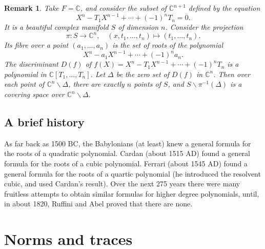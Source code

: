 \documentclass[a4paper,11pt,final,openany]{memoir}
\newtheorem{remark}[X]{Remark}
\theoremstyle{nonumberplain}
\begin{document}
\begin{remark}
\label{ag31}Take $F=\mathbb{C}$, and consider the subset of $\mathbb{C}^{n+1}
$ defined by the equation%
\[
X^{n}-T_{1}X^{n-1}+\cdots+(-1)^{n}T_{n}=0.
\]
It is a beautiful complex manifold $S$ of dimension $n$. Consider the
projection
\[
\pi\colon S\rightarrow\mathbb{C}^{n},\quad(x,t_{1},\ldots,t_{n})\mapsto
(t_{1},\ldots,t_{n}).
\]
Its fibre over a point $(a_{1},\ldots,a_{n})$ is the set of roots of the
polynomial
\[
X^{n}-a_{1}X^{n-1}+\cdots+(-1)^{n}a_{n}.
\]
The discriminant $D(f)$ of $f(X)=X^{n}-T_{1}X^{n-1}+\cdots+(-1)^{n}T_{n}$ is a
polynomial in $\mathbb{C}[T_{1},\ldots,T_{n}]$. Let $\Delta$ be the zero set
of $D(f)$ in $\mathbb{C}^{n}$. Then over each point of $\mathbb{C}%
^{n}\smallsetminus\Delta$, there are exactly $n$ points of $S$, and
$S\smallsetminus\pi^{-1}(\Delta)$ is a covering space over $\mathbb{C}%
^{n}\smallsetminus\Delta$.
\end{remark}

\subsection{A brief history}

As far back as 1500 BC, the Babylonians (at least) knew a general formula for
the roots of a quadratic polynomial. Cardan (about 1515 AD) found a general
formula for the roots of a cubic polynomial. Ferrari (about 1545 AD) found a
general formula for the roots of a quartic polynomial (he introduced the
resolvent cubic, and used Cardan's result). Over the next 275 years there were
many fruitless attempts to obtain similar formulas for higher degree
polynomials, until, in about 1820, Ruffini and Abel proved that there are none.

\section{Norms and traces}
\end{document}
